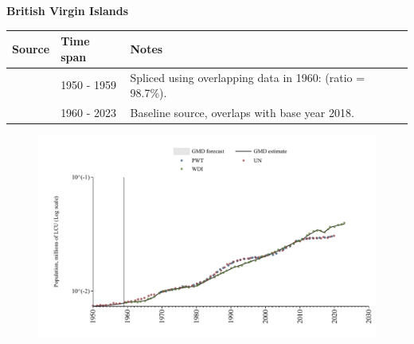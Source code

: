 \documentclass[12pt,a4paper,landscape]{article}
\begin{document}
\begin{adjustbox}{max totalsize={\paperwidth}{\paperheight},center}
\begin{minipage}[t][\textheight][t]{\textwidth}
\vspace*{0.5cm}
{}
\begin{center}
{\Large\bfseries British Virgin Islands}
\end{center}
\vspace{0.5cm}
\begin{table}[H]
\centering
\small
\begin{tabular}{|l|l|l|}
\hline
\textbf{Source} & \textbf{Time span} & \textbf{Notes} \\
\hline
\rowcolor{white}\cite{UN}& 1950 - 1959 &Spliced using overlapping data in 1960: (ratio = 98.7\%).\\
\rowcolor{lightgray}\cite{WDI}& 1960 - 2023 &Baseline source, overlaps with base year 2018.\\
\hline
\end{tabular}
\end{table}
\begin{figure}[H]
\centering
\includegraphics[width=\textwidth,height=0.6\textheight,keepaspectratio]{graphs/VGB_pop.pdf}
\end{figure}
\end{minipage}
\end{adjustbox}
\end{document}
